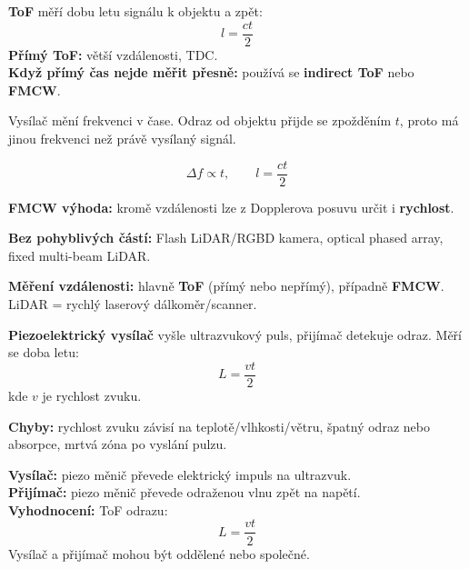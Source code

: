 \documentclass[12pt]{article}
\newcounter{chapternumber}
\newcounter{questionnumber}
\renewcommand{\thequestionnumber}{\arabic{chapternumber}.\arabic{questionnumber}}
\begin{document}
\begin{tcolorbox}[title={\stepcounter{questionnumber}\thequestionnumber. Popište princip senzorů vzdálenosti typu „Time of Flight“. V jakých případech se doslova vyhodnocuje čas, a kdy to technicky nejde? Jaká metoda se v takovém případě používá? (32)}]
\textbf{ToF} měří dobu letu signálu k objektu a zpět:
\[
l=\frac{ct}{2}
\]
\textbf{Přímý ToF:} větší vzdálenosti, TDC.\\
\textbf{Když přímý čas nejde měřit přesně:} používá se \textbf{indirect ToF} nebo \textbf{FMCW}.
\end{tcolorbox}

\begin{tcolorbox}[title={\stepcounter{questionnumber}\thequestionnumber. Na nakresleném schématu vysvětlete princip senzoru „Time of Flight“ s frekvenční modulací (FMCW). (32)}]
Vysílač mění frekvenci v čase. Odraz od objektu přijde se zpožděním $t$, proto má jinou frekvenci než právě vysílaný signál.

\[
\Delta f \propto t,\qquad l=\frac{ct}{2}
\]

\textbf{FMCW výhoda:} kromě vzdálenosti lze z Dopplerova posuvu určit i \textbf{rychlost}.
\end{tcolorbox}

\begin{tcolorbox}[title={\stepcounter{questionnumber}\thequestionnumber. Uveďte tři typy LiDARu bez pohyblivých součástí. Jaký princip používá LiDAR pro měření vzdálenosti? (35)}]
\textbf{Bez pohyblivých částí:} Flash LiDAR/RGBD kamera, optical phased array, fixed multi-beam LiDAR.

\textbf{Měření vzdálenosti:} hlavně \textbf{ToF} (přímý nebo nepřímý), případně \textbf{FMCW}. LiDAR = rychlý laserový dálkoměr/scanner.
\end{tcolorbox}

\begin{tcolorbox}[title={\stepcounter{questionnumber}\thequestionnumber. Jak funguje ultrazvukový dálkoměr? Napište rovnice. Uveďte tři možné příčiny chyb měření. (42)}]
\textbf{Piezoelektrický vysílač} vyšle ultrazvukový puls, přijímač detekuje odraz. Měří se doba letu:
\[
L=\frac{v t}{2}
\]
kde $v$ je rychlost zvuku.

\textbf{Chyby:} rychlost zvuku závisí na teplotě/vlhkosti/větru, špatný odraz nebo absorpce, mrtvá zóna po vyslání pulzu.
\end{tcolorbox}

\begin{tcolorbox}[title={\stepcounter{questionnumber}\thequestionnumber. Popište funkci ultrazvukového senzoru vzdálenosti (obrázek, rovnice, jak funguje vysílač/přijímač?). (42)}]
\textbf{Vysílač:} piezo měnič převede elektrický impuls na ultrazvuk.\\
\textbf{Přijímač:} piezo měnič převede odraženou vlnu zpět na napětí.\\
\textbf{Vyhodnocení:} ToF odrazu:
\[
L=\frac{v t}{2}
\]
Vysílač a přijímač mohou být oddělené nebo společné.
\end{tcolorbox}
\end{document}
